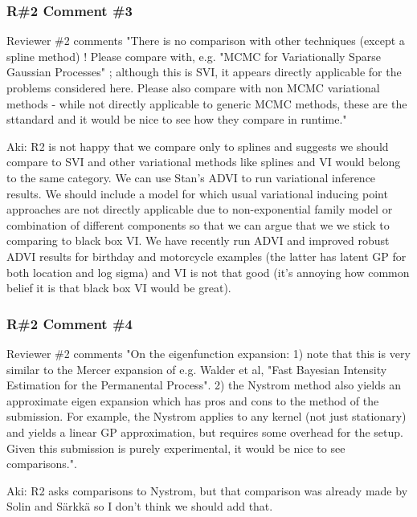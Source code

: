 \documentclass[11pt]{report}
\begin{document}
\subsubsection*{R\#2 Comment \#3}
Reviewer \#2 comments "There is no comparison with other techniques (except a spline method) ! Please compare with, e.g. "MCMC for Variationally Sparse Gaussian Processes" ; although this is SVI, it appears directly applicable for the problems considered here. Please also compare with non MCMC variational methods - while not directly applicable to generic MCMC methods, these are the sttandard and it would be nice to see how they compare in runtime." 

Aki: R2 is not happy that we compare only to splines and suggests we should compare to SVI and other variational methods like splines and VI would belong to the same category. We can use Stan's ADVI to run variational inference results. We should include a model for which usual variational inducing point approaches are not directly applicable due to non-exponential family model or combination of different components so that we can argue that we we stick to comparing to black box VI. We have recently run ADVI and improved robust ADVI results for birthday and motorcycle examples (the latter has latent GP for both location and log sigma)
and VI is not that good (it's annoying how common belief it is that black box
VI would be great).

\subsubsection*{R\#2 Comment \#4}

Reviewer \#2 comments "On the eigenfunction expansion: 1) note that this is very similar to the Mercer expansion of e.g. Walder et al, "Fast Bayesian Intensity Estimation for the Permanental Process". 2) the Nystrom method also yields an approximate eigen expansion which has pros and cons to the method of the submission. For example, the Nystrom applies to any kernel (not just stationary) and yields a linear GP approximation, but requires some overhead for the setup. Given this submission is purely experimental, it would be nice to see comparisons.". 

Aki: R2 asks comparisons to Nystrom, but that comparison was
already made by Solin and Särkkä so I don't think we should add that.



\end{document}
